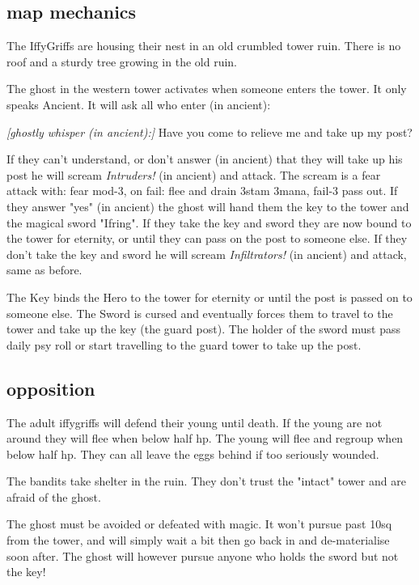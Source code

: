\subsection*{map mechanics}

The IffyGriffs are housing their nest in an old crumbled tower ruin. There is no roof and a sturdy tree growing in the old ruin.

The ghost in the western tower activates when someone enters the tower. It only speaks Ancient. It will ask all who enter (in ancient):
\begin{readoutloud}
\emph{[ghostly whisper (in ancient):]}
Have you come to relieve me and take up my post?
\end{readoutloud}
If they can't understand, or don't answer (in ancient) that they will take up his post he will scream \emph{Intruders!} (in ancient) and attack. The scream is a fear attack with: fear mod-3, on fail: flee and drain 3stam 3mana, fail-3 pass out.
If they answer "yes" (in ancient) the ghost will hand them the key to the tower and the magical sword "Ifring". If they take the key and sword they are now bound to the tower for eternity, or until they can pass on the post to someone else. If they don't take the key and sword he will scream \emph{Infiltrators!} (in ancient) and attack, same as before.

The Key binds the Hero to the tower for eternity or until the post is passed on to someone else. The Sword is cursed and eventually forces them to travel to the tower and take up the key (the guard post). The holder of the sword must pass daily psy roll or start travelling to the guard tower to take up the post.


\subsection*{opposition}

The adult iffygriffs will defend their young until death. If the young are not around they will flee when below half hp. The young will flee and regroup when below half hp. They can all leave the eggs behind if too seriously wounded.

The bandits take shelter in the ruin. They don't trust the "intact" tower and are afraid of the ghost.

The ghost must be avoided or defeated with magic. It won't pursue past 10sq from the tower, and will simply wait a bit then go back in and de-materialise soon after. The ghost will however pursue anyone who holds the sword but not the key!


